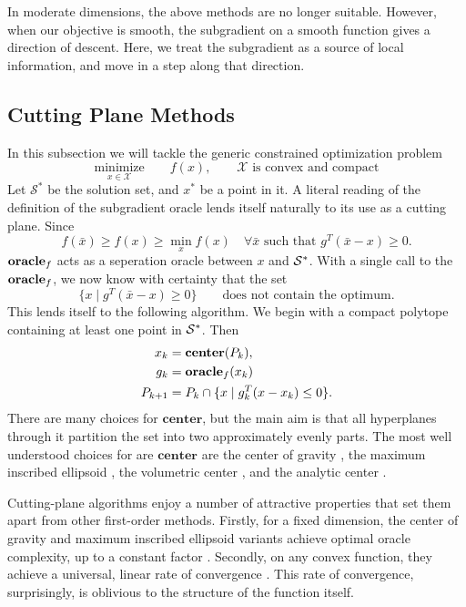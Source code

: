 In moderate dimensions, the above methods are no longer suitable. However,
when our objective is smooth, the subgradient on a smooth function gives a
direction of descent. Here, we treat the subgradient as a source of local
information, and move in a step along that direction.

\subsection{Cutting Plane Methods} In this subsection we will tackle the 
generic constrained optimization problem
$$
\underset{x \in \mathcal{X}}{\mbox{minimize}}\qquad f(x), \qquad \mathcal{X} \mbox{ is convex and compact}
$$
Let $\mathcal{S}^*$ be the solution set, and $x^*$ be a point in it. A literal reading of the definition of the subgradient oracle lends itself naturally to its use as a cutting plane. Since
\[
f(\bar{x}) \geq f(x) \geq \min_x f(x)
	\quad\forall \mbox{$\bar{x}$ such that ${g^T}{(\bar{x}-x)}\geq 0$}.
\]
$\mbox{\bf oracle}_f$ acts as a seperation oracle between $x$ and $\mathcal{S^*}$.
With a single call to the $\mbox{\bf oracle}_f$, we now know with 
certainty that the set
$$\{ x \mid {g^T}{(\bar{x}-x)}\geq 0 \} \qquad \mbox{does not contain
the optimum.}$$ 
This lends itself to the following algorithm. We begin with a compact
polytope containing at least one point in $\mathcal{S^*}$. Then
\begin{align*}
  x_{k} & = \mathbf{center}(P_k), \\
  \quad g_k &= \mbox{\bf oracle}_f(x_k)
\\P_{k+1} & = P_k \cap \{x \mid g_k^T(x -x_k) \leq 0 \}.
\end{align*}
There are many choices for $\mathbf{center}$, but the main aim is that all
hyperplanes through it partition the set into two approximately
evenly parts. The most well understood choices for are $\mathbf{center}$ are 
the center of gravity \cite{levin1965algorithm,newman1965location},
the maximum inscribed ellipsoid \cite{tarasov1988method}, the
volumetric center \cite{vaidya1989new}, and the analytic center
\cite{ye1996complexity}.

Cutting-plane algorithms enjoy a number of attractive properties that
set them apart from other first-order methods.  Firstly, for a fixed
dimension, the center of gravity and maximum inscribed ellipsoid
variants achieve optimal oracle complexity, up to a constant factor
\cite{nemirovski1994efficient}. Secondly, on any convex function, they
achieve a universal, linear rate of convergence
\cite{nemirovski1994efficient}. This rate of convergence,
surprisingly, is oblivious to the structure of the function itself.

